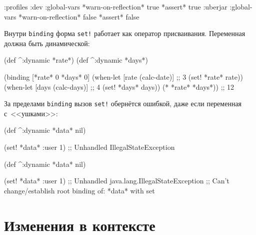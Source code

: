 \begin{english}
  \begin{clojure}
{:profiles
 :dev {:global-vars {*warn-on-reflection* true
                     *assert* true}}
 :uberjar {:global-vars {*warn-on-reflection* false
                         *assert* false}}}
  \end{clojure}
\end{english}

\fi

Внутри \verb|binding| форма \verb|set!| работает как оператор
присваивания. Переменная должна быть динамической:

\begin{english}
  \begin{clojure}
(def ^:dynamic *rate*)
(def ^:dynamic *days*)

(binding [*rate* 0
          *days* 0]
  (when-let [rate (calc-date)] ;; 3
    (set! *rate* rate))
  (when-let [days (calc-days)] ;; 4
    (set! *days* days))
  (* *rate* *days*))
;; 12
  \end{clojure}
\end{english}

\noindent
За пределами \verb|binding| вызов \verb|set!| обернётся ошибкой, даже если
переменная с~<<ушками>>:

\ifx\DEVICETYPE\MOBILE

\begin{english}
  \begin{clojure}
(def ^:dynamic *data* nil)

(set! *data* {:user 1})
;; Unhandled IllegalStateException
  \end{clojure}
\end{english}

\else

\begin{english}
  \begin{clojure}
(def ^:dynamic *data* nil)

(set! *data* {:user 1})
;; Unhandled java.lang.IllegalStateException
;; Can't change/establish root binding of: *data* with set
  \end{clojure}
\end{english}

\fi

\section{Изменения в контексте}


